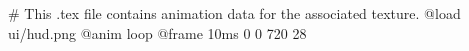 # This .tex file contains animation data for the associated texture.
@load ui/hud.png
@anim loop
	@frame 10ms 0 0 720 28